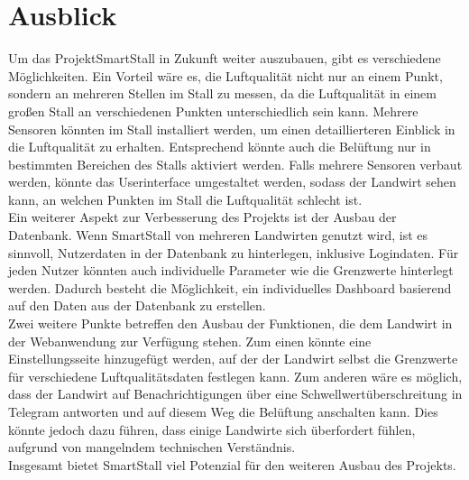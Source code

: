 \documentclass[conference]{IEEEtran}
\begin{document}
\section{Ausblick}
Um das ProjektSmartStall in Zukunft weiter auszubauen, gibt es verschiedene Möglichkeiten. Ein Vorteil wäre es, die Luftqualität nicht nur an einem Punkt, sondern an mehreren Stellen im Stall zu messen, da die Luftqualität in einem großen Stall an verschiedenen Punkten unterschiedlich sein kann. Mehrere Sensoren könnten im Stall installiert werden, um einen detaillierteren Einblick in die Luftqualität zu erhalten. Entsprechend könnte auch die Belüftung nur in bestimmten Bereichen des Stalls aktiviert werden. Falls mehrere Sensoren verbaut werden, könnte das Userinterface umgestaltet werden, sodass der Landwirt sehen kann, an welchen Punkten im Stall die Luftqualität schlecht ist. \\
Ein weiterer Aspekt zur Verbesserung des Projekts ist der Ausbau der Datenbank. Wenn SmartStall von mehreren Landwirten genutzt wird, ist es sinnvoll, Nutzerdaten in der Datenbank zu hinterlegen, inklusive Logindaten. Für jeden Nutzer könnten auch individuelle Parameter wie die Grenzwerte hinterlegt werden. Dadurch besteht die Möglichkeit, ein individuelles Dashboard basierend auf den Daten aus der Datenbank zu erstellen. \\
Zwei weitere Punkte betreffen den Ausbau der Funktionen, die dem Landwirt in der Webanwendung zur Verfügung stehen. Zum einen könnte eine Einstellungsseite hinzugefügt werden, auf der der Landwirt selbst die Grenzwerte für verschiedene Luftqualitätsdaten festlegen kann. Zum anderen wäre es möglich, dass der Landwirt auf Benachrichtigungen über eine Schwellwertüberschreitung in Telegram antworten und auf diesem Weg die Belüftung anschalten kann. Dies könnte jedoch dazu führen, dass einige Landwirte sich überfordert fühlen, aufgrund von mangelndem technischen Verständnis. \\
Insgesamt bietet SmartStall viel Potenzial für den weiteren Ausbau des Projekts.
\end{document}
